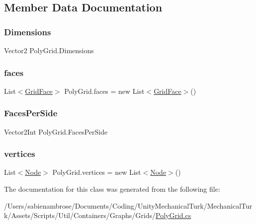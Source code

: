 \subsection{Member Data Documentation}
\mbox{\label{class_poly_grid_aeebd9e2f028fa1d79b48a61cf65a6829}} 
\subsubsection{\texorpdfstring{Dimensions}{Dimensions}}
{\footnotesize\ttfamily Vector2 Poly\+Grid.\+Dimensions}

\mbox{\label{class_poly_grid_ad1f5acf9cfbd3a2ad7add30d87eb0416}} 
\subsubsection{\texorpdfstring{faces}{faces}}
{\footnotesize\ttfamily List$<$\mbox{\hyperlink{class_grid_face}{Grid\+Face}}$>$ Poly\+Grid.\+faces = new List$<$\mbox{\hyperlink{class_grid_face}{Grid\+Face}}$>$()\hspace{0.3cm}{\ttfamily [protected]}}

\mbox{\label{class_poly_grid_aa3d72d505c3c008a5bd52a448d932840}} 
\subsubsection{\texorpdfstring{Faces\+Per\+Side}{FacesPerSide}}
{\footnotesize\ttfamily Vector2\+Int Poly\+Grid.\+Faces\+Per\+Side}

\mbox{\label{class_poly_grid_a40f18bd5bd749337828beb314e43a36e}} 
\subsubsection{\texorpdfstring{vertices}{vertices}}
{\footnotesize\ttfamily List$<$\mbox{\hyperlink{class_node}{Node}}$>$ Poly\+Grid.\+vertices = new List$<$\mbox{\hyperlink{class_node}{Node}}$>$()\hspace{0.3cm}{\ttfamily [protected]}}



The documentation for this class was generated from the following file\+:\begin{DoxyCompactItemize}
\item 
/\+Users/sabienambrose/\+Documents/\+Coding/\+Unity\+Mechanical\+Turk/\+Mechanical\+Turk/\+Assets/\+Scripts/\+Util/\+Containers/\+Graphs/\+Grids/\mbox{\hyperlink{_poly_grid_8cs}{Poly\+Grid.\+cs}}\end{DoxyCompactItemize}
